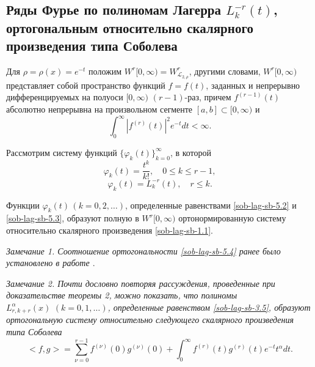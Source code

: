 \subsection{Ряды Фурье по полиномам Лагерра $L_k^{-r}(t)$, ортогональным относительно скалярного произведения типа Соболева}

Для $\rho=\rho(x)=e^{-t}$ положим $W^r[0,\infty)= W^r_{\mathcal{L}_{2,\rho}}$, другими словами, $W^r[0,\infty)$ представляет собой  пространство функций $f=f(t)$, заданных и непрерывно дифференцируемых  на полуоси $[0,\infty)$
$(r-1)$-раз, причем $f^{(r-1)}(t)$ абсолютно непрерывна на произвольном сегменте $[a,b]\subset [0,\infty)$ и
\begin{equation}\label{sob-lag-sb-5.1}
  \int_0^\infty |f^{(r)}(t)|^2e^{-t}dt <\infty.
  \end{equation}

Рассмотрим систему функций $\{\varphi_k(t)\}_{k=0}^\infty$,  в которой
\begin{equation}\label{sob-lag-sb-5.2}
  \varphi_k(t)=\frac{t^k}{k!}, \quad 0\le k\le r-1,
  \end{equation}
\begin{equation}\label{sob-lag-sb-5.3}
  \varphi_k(t)=L_k^{-r}(t), \quad r\le k .
  \end{equation}

\begin{theorem}
Функции $\varphi_k(t)\, (k=0,2,\ldots) $, определенные равенствами \eqref{sob-lag-sb-5.2} и \eqref{sob-lag-sb-5.3}, образуют  полную  в $W^r[0,\infty)$ ортонормированную  систему относительно скалярного произведения \eqref{sob-lag-sb-1.1}.
\end{theorem}
\textit{Замечание 1. Соотношение ортогональности \eqref{sob-lag-sb-5.4} ранее было установлено  в работе \cite{sob-lag-sb-KwonLittl1}}.

\textit{Замечание 2. Почти дословно повторяя рассуждения, проведенные при доказательстве теоремы 2, можно показать, что полиномы $L_{r,k+r}^\alpha(x)\,\, (k=0,1,\ldots)$, определенные равенством \eqref{sob-lag-sb-3.5}, образуют ортогональную систему относительно следующего скалярного произведения типа Соболева
\begin{equation*}
<f,g>=\sum_{\nu=0}^{r-1}f^{(\nu)}(0)g^{(\nu)}(0)+\int_0^\infty f^{(r)}(t)g^{(r)}(t)e^{-t}t^\alpha dt.
\end{equation*}
}

